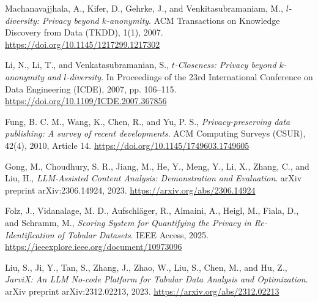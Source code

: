 \documentclass{article}
\begin{document}
\begin{thebibliography}{9}
Machanavajjhala, A., Kifer, D., Gehrke, J., and Venkitasubramaniam, M.,
\emph{$l$-diversity: Privacy beyond $k$-anonymity}. ACM Transactions on Knowledge Discovery from Data (TKDD), 1(1), 2007.
\href{https://doi.org/10.1145/1217299.1217302}{https://doi.org/10.1145/1217299.1217302}

Li, N., Li, T., and Venkatasubramanian, S.,
\emph{$t$-Closeness: Privacy beyond $k$-anonymity and $l$-diversity}. In Proceedings of the 23rd International Conference on Data Engineering (ICDE), 2007, pp. 106–115.
\href{https://doi.org/10.1109/ICDE.2007.367856}{https://doi.org/10.1109/ICDE.2007.367856}

Fung, B. C. M., Wang, K., Chen, R., and Yu, P. S.,
\emph{Privacy-preserving data publishing: A survey of recent developments}. ACM Computing Surveys (CSUR), 42(4), 2010, Article 14.
\href{https://doi.org/10.1145/1749603.1749605}{https://doi.org/10.1145/1749603.1749605}





Gong, M., Choudhury, S. R., Jiang, M., He, Y., Meng, Y., Li, X., Zhang, C., and Liu, H.,
\emph{LLM-Assisted Content Analysis: Demonstration and Evaluation}. arXiv preprint arXiv:2306.14924, 2023.
\href{https://arxiv.org/abs/2306.14924}{https://arxiv.org/abs/2306.14924}

Folz, J., Vidanalage, M. D., Aufschläger, R., Almaini, A., Heigl, M., Fiala, D., and Schramm, M.,
\emph{Scoring System for Quantifying the Privacy in Re-Identification of Tabular Datasets}. IEEE Access, 2025.
\href{https://ieeexplore.ieee.org/document/10973096}{https://ieeexplore.ieee.org/document/10973096}

Liu, S., Ji, Y., Tan, S., Zhang, J., Zhao, W., Liu, S., Chen, M., and Hu, Z.,
\emph{JarviX: An LLM No-code Platform for Tabular Data Analysis and Optimization}. arXiv preprint arXiv:2312.02213, 2023.
\href{https://arxiv.org/abs/2312.02213}{https://arxiv.org/abs/2312.02213}



\end{thebibliography}
\end{document}
